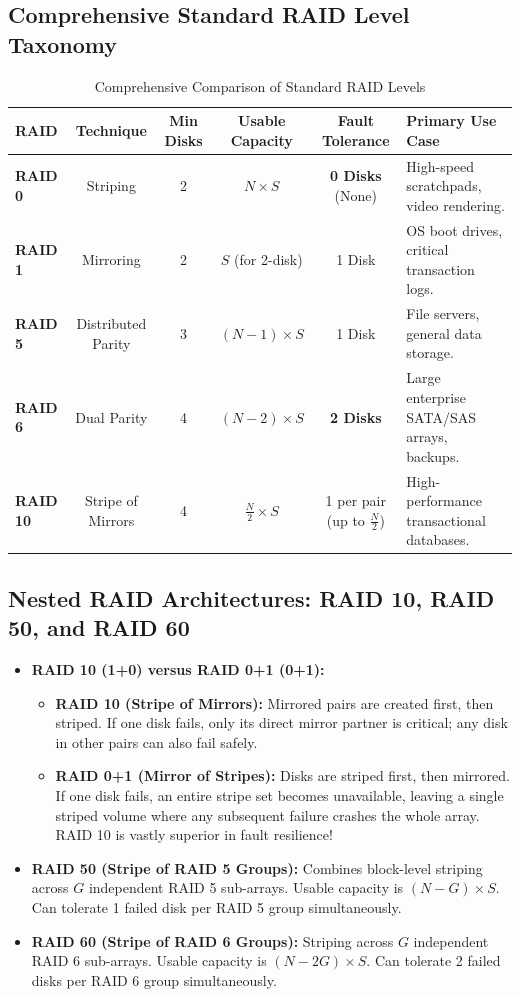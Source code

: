 \subsection{Comprehensive Standard RAID Level Taxonomy}
\begin{table}[htbp]
\centering
\small
\caption{Comprehensive Comparison of Standard RAID Levels}
\label{tab:raid_levels}
\begin{tabularx}{\textwidth}{l c c c c X}
\toprule
\textbf{RAID} & \textbf{Technique} & \textbf{Min Disks} & \textbf{Usable Capacity} & \textbf{Fault Tolerance} & \textbf{Primary Use Case} \\
\midrule
\textbf{RAID 0} & Striping & 2 & $N \times S$ & \textbf{0 Disks} (None) & High-speed scratchpads, video rendering. \\
\textbf{RAID 1} & Mirroring & 2 & $S$ (for 2-disk) & 1 Disk & OS boot drives, critical transaction logs. \\
\textbf{RAID 5} & Distributed Parity & 3 & $(N - 1) \times S$ & 1 Disk & File servers, general data storage. \\
\textbf{RAID 6} & Dual Parity & 4 & $(N - 2) \times S$ & \textbf{2 Disks} & Large enterprise SATA/SAS arrays, backups. \\
\textbf{RAID 10} & Stripe of Mirrors & 4 & $\frac{N}{2} \times S$ & 1 per pair (up to $\frac{N}{2}$) & High-performance transactional databases. \\
\bottomrule
\end{tabularx}
\end{table}

\subsection{Nested RAID Architectures: RAID 10, RAID 50, and RAID 60}
\begin{itemize}
    \item \textbf{RAID 10 (1+0) versus RAID 0+1 (0+1):}
    \begin{itemize}
        \item \textbf{RAID 10 (Stripe of Mirrors):} Mirrored pairs are created first, then striped. If one disk fails, only its direct mirror partner is critical; any disk in other pairs can also fail safely.
        \item \textbf{RAID 0+1 (Mirror of Stripes):} Disks are striped first, then mirrored. If one disk fails, an entire stripe set becomes unavailable, leaving a single striped volume where any subsequent failure crashes the whole array. RAID 10 is vastly superior in fault resilience!
    \end{itemize}
    \item \textbf{RAID 50 (Stripe of RAID 5 Groups):} Combines block-level striping across $G$ independent RAID 5 sub-arrays. Usable capacity is $(N - G) \times S$. Can tolerate 1 failed disk per RAID 5 group simultaneously.
    \item \textbf{RAID 60 (Stripe of RAID 6 Groups):} Striping across $G$ independent RAID 6 sub-arrays. Usable capacity is $(N - 2G) \times S$. Can tolerate 2 failed disks per RAID 6 group simultaneously.
\end{itemize}

